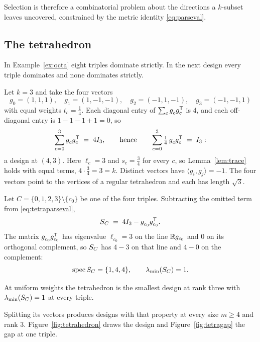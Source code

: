 Selection is therefore a combinatorial problem about the directions a
$k$-subset leaves uncovered, constrained by the metric identity
\eqref{eq:parseval}.

\subsection{The tetrahedron}

In Example~\ref{ex:octa} eight triples dominate strictly.  In the next
design every triple dominates and none dominates strictly.

\begin{example}[Lean]\label{ex:tetra}
Let $k=3$ and take the four vectors
\[
  g_0=(1,1,1),\quad g_1=(1,-1,-1),\quad g_2=(-1,1,-1),\quad g_3=(-1,-1,1)
\]
with equal weights $t_c=\tfrac14$.  Each diagonal entry of
$\sum_c g_c^{\vphantom{\mathsf{T}}}g_c\tp$ is $4$, and each off-diagonal entry is
$1-1-1+1=0$, so
\begin{equation}\label{eq:tetraparseval}
  \sum_{c=0}^{3} g_c^{\vphantom{\mathsf{T}}}g_c\tp\;=\;4I_3,
  \qquad\text{hence}\qquad
  \sum_{c=0}^{3}\tfrac14\,g_c^{\vphantom{\mathsf{T}}}g_c\tp\;=\;I_3 :
\end{equation}
a design at $(4,3)$.  Here $\ell_c=3$ and $s_c=\tfrac34$ for every $c$, so
Lemma~\ref{lem:trace} holds with equal terms, $4\cdot\tfrac34=3=k$.
Distinct vectors have $\langle g_i,g_j\rangle=-1$.  The four vectors point
to the vertices of a regular tetrahedron and each has length $\sqrt3$.

Let $C=\{0,1,2,3\}\setminus\{c_0\}$ be one of the four triples.
Subtracting the omitted term from \eqref{eq:tetraparseval},
\[
  \SC\;=\;4I_3-g_{c_0}^{\vphantom{\mathsf{T}}}g_{c_0}\tp .
\]
The matrix $g_{c_0}^{\vphantom{\mathsf{T}}}g_{c_0}\tp$ has eigenvalue
$\ell_{c_0}=3$ on the line $\mathbb{R} g_{c_0}$ and $0$ on its orthogonal
complement, so $S_{C}$ has $4-3$ on that line and $4-0$ on the complement:
\begin{equation}\label{eq:tetraspec}
  \operatorname{spec}S_{C}=\{1,4,4\},\qquad \lambda_{\min}(S_{C})=1 .
\end{equation}
\end{example}

At uniform weights the tetrahedron is the smallest design at rank three
with $\lambda_{\min}(S_{C})=1$ at every triple.

Splitting its vectors produces designs with that property at every size
$m\ge4$ and rank $3$.  Figure~\ref{fig:tetrahedron} draws the design and
Figure~\ref{fig:tetragap} the gap at one triple.

